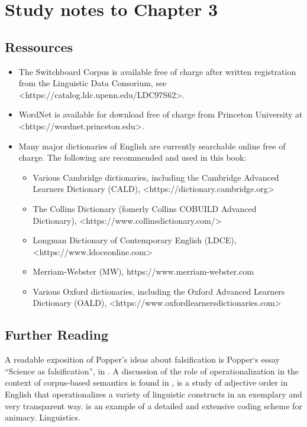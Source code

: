 \section{Study notes to Chapter 3}
\label{sec:studynotes03}

\subsection{Ressources}
\label{sec:ressources03}

\begin{itemize}
    \item The Switchboard Corpus is available free of charge after written registration from the Linguistic Data Consorium, see <https://catalog.ldc.upenn.edu/LDC97S62>.
    \item WordNet is available for download free of charge from Princeton University at <https://wordnet.princeton.edu>.
    \item Many major dictionaries of English are currently searchable online free of charge. The following are recommended and used in this book:
    \begin{itemize}
    	\item Various Cambridge dictionaries, including the Cambridge Advanced Learners Dictionary (CALD), <https://dictionary.cambridge.org>
    	\item The Collins Dictionary (fomerly Collins COBUILD Advanced Dictionary), <https://www.collinsdictionary.com/>
        \item Longman Dictionary of Contemporary English (LDCE), <https://www.ldoceonline.com>
        \item Merriam-Webster (MW), https://www.merriam-webster.com
        \item Various Oxford dictionaries, including the Oxford Advanced Learners Dictionary (OALD), <https://www.oxfordlearnersdictionaries.com>
    \end{itemize}
\end{itemize}

\subsection{Further Reading}
\label{sec:furtherreading03}

A readable exposition of Popper's ideas about falsification is Popper‘s essay “Science as falsification”, in \citet{popper_conjectures_1963}. A discussion of the role of operationalization in the context of corpus-based semantics is found in \citet{glynn_empirical_2010}, \citet{wulff_multifactorial_2003,} is a study of adjective order in English that operationalizes a variety of linguistic constructs in an exemplary and very transparent way. \citet{zaenen_animacy_2004} is an example of a detailed and extensive coding scheme for animacy.
Linguistics.


